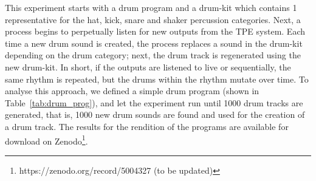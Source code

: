 \documentclass[\main/thesis.tex]{subfiles}
\begin{document}
This experiment starts with a drum program and a drum-kit which contains 1 representative for the hat, kick, snare and shaker percussion categories. Next, a process begins to perpetually listen for new outputs from the TPE system. Each time a new drum sound is created, the process replaces a sound in the drum-kit depending on the drum category; next, the drum track is regenerated using the new drum-kit. In short, if the outputs are listened to live or sequentially, the same rhythm is repeated, but the drums within the rhythm mutate over time. To analyse this approach, we defined a simple drum program (shown in Table~\ref{tab:drum_prog}), and let the experiment run until 1000 drum tracks are generated, that is, 1000 new drum sounds are found and used for the creation of a drum track. The results for the rendition of the programs are available for download on Zenodo\footnote{https://zenodo.org/record/5004327  (to be updated)}. 
\begin{table}[tbp]
\caption{\label{tab:drum_prog} Parameters for each drum program.\enquote{.} indicates no action}
\end{table}
\end{document}
